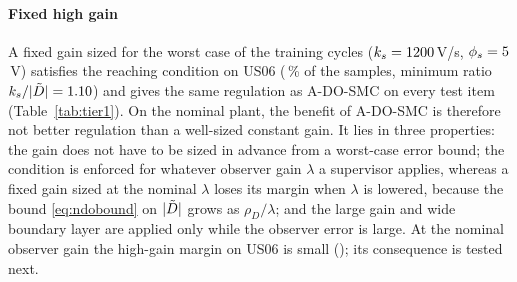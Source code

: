 \paragraph{Fixed high gain}
A fixed gain sized for the worst case of the training cycles ($k_s=1200$\,V/s, $\phi_s=5$\,V) satisfies the reaching condition on US06 (\CondHiFrac\,\% of the samples, minimum ratio $k_s/|\tilde{D}|=1.10$) and gives the same regulation as A-DO-SMC on every test item (Table~\ref{tab:tier1}). On the nominal plant, the benefit of A-DO-SMC is therefore not better regulation than a well-sized constant gain. It lies in three properties: the gain does not have to be sized in advance from a worst-case error bound; the condition is enforced for whatever observer gain $\lambda$ a supervisor applies, whereas a fixed gain sized at the nominal $\lambda$ loses its margin when $\lambda$ is lowered, because the bound \eqref{eq:ndobound} on $|\tilde{D}|$ grows as $\rho_D/\lambda$; and the large gain and wide boundary layer are applied only while the observer error is large. At the nominal observer gain the high-gain margin on US06 is small (\CondHiMin); its consequence is tested next.

